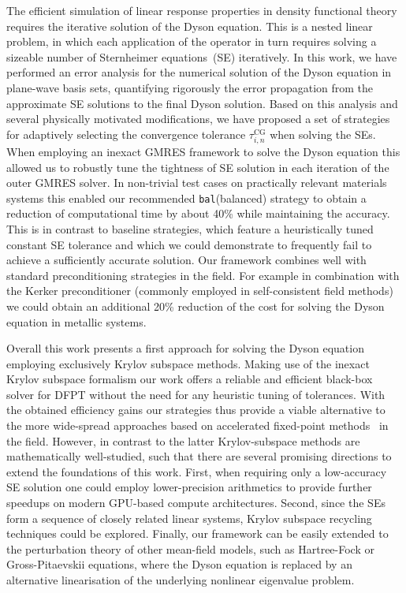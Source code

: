 \documentclass[hidelinks,onefignum,onetabnum]{siamart250211}
\newcommand{\taucg}{\tau^{\mathrm{CG}}}
\newcommand{\sbal}{\texttt{bal}\xspace}
\begin{document}
The efficient simulation of linear response properties in density functional theory
requires the iterative solution of the Dyson equation.
This is a nested linear problem, in which each application of the operator
in turn requires solving a sizeable number of Sternheimer equations~(SE) iteratively.
In this work, we have performed an error analysis for the numerical solution of the
Dyson equation in plane-wave basis sets, quantifying rigorously the error propagation
from the approximate SE solutions to the final Dyson solution.
Based on this analysis and several physically motivated modifications, we have proposed
a set of strategies for adaptively selecting the convergence tolerance $\taucg_{i,n}$
when solving the SEs.
When employing an inexact GMRES framework to solve the Dyson equation
this allowed us to robustly tune the tightness of SE solution in each iteration
of the outer GMRES solver.
In non-trivial test cases on practically relevant materials systems
this enabled our recommended \sbal (balanced) strategy to obtain
a reduction of computational time by about 40\%
while maintaining the accuracy.
This is in contrast to baseline strategies, which feature a heuristically tuned
constant SE tolerance and which we could demonstrate to frequently fail
to achieve a sufficiently accurate solution.
Our framework combines well with standard preconditioning strategies in the field.
For example in combination with the
Kerker preconditioner (commonly employed in self-consistent field methods)
we could obtain an additional 20\% reduction of the cost
for solving the Dyson equation in metallic systems.

%
%
%
%
%
%
Overall this work presents a first approach for solving the Dyson
equation employing exclusively Krylov subspace methods.
Making use of the inexact Krylov subspace formalism our work offers
a reliable and efficient black-box solver
for DFPT without the need for any heuristic tuning of tolerances.
With the obtained efficiency gains our strategies thus provide
a viable alternative to the more wide-spread approaches based on
accelerated fixed-point methods~\cite{gonze1995adiabatic,baroni2001phonons,Gonze1997}
in the field.
However, in contrast to the latter Krylov-subspace methods are mathematically
well-studied, such that there are several promising directions to extend
the foundations of this work. 
First, when requiring only a low-accuracy SE solution
one could employ lower-precision arithmetics to provide further speedups
on modern GPU-based compute architectures.
%
%
%
Second, since the SEs form a sequence of closely related
linear systems, Krylov subspace recycling techniques could be explored.
%
Finally, our framework can be easily extended to the perturbation theory of other
mean-field models, such as Hartree-Fock or Gross-Pitaevskii equations, where
the Dyson equation is replaced by an alternative linearisation of the
underlying nonlinear eigenvalue problem.
\end{document}
